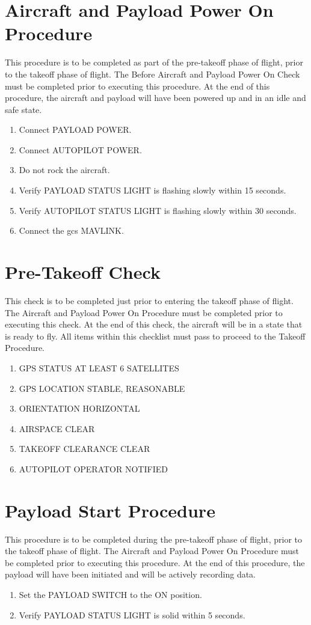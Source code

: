 \documentclass{report}
\begin{document}
	\section{Aircraft and Payload Power On Procedure}
		This procedure is to be completed as part of the pre-takeoff phase of flight, prior to the takeoff phase of flight.  The Before Aircraft and Payload Power On Check must be completed prior to executing this procedure.  At the end of this procedure, the aircraft and payload will have been powered up and in an idle and safe state.
		\begin{enumerate}
			\item Connect PAYLOAD POWER.
			\item Connect AUTOPILOT POWER.
			\item Do not rock the aircraft.
			\item Verify PAYLOAD STATUS LIGHT is flashing slowly within 15 seconds.
			\item Verify AUTOPILOT STATUS LIGHT is flashing slowly within 30 seconds.
			\item Connect the \gls{gcs} MAVLINK.
		\end{enumerate}
	\section{Pre-Takeoff Check}
		This check is to be completed just prior to entering the takeoff phase of flight.  The Aircraft and Payload Power On Procedure must be completed prior to executing this check.  At the end of this check, the aircraft will be in a state that is ready to fly.  All items within this checklist must pass to proceed to the Takeoff Procedure.
		\begin{enumerate}
			\item GPS STATUS \hrulefill AT LEAST 6 SATELLITES
			\item GPS LOCATION \hrulefill STABLE, REASONABLE
			\item ORIENTATION \hrulefill HORIZONTAL
			\item AIRSPACE \hrulefill CLEAR
			\item TAKEOFF CLEARANCE \hrulefill CLEAR
			\item AUTOPILOT OPERATOR \hrulefill NOTIFIED
		\end{enumerate}
	\section{Payload Start Procedure}
		This procedure is to be completed during the pre-takeoff phase of flight, prior to the takeoff phase of flight.  The Aircraft and Payload Power On Procedure must be completed prior to executing this procedure.  At the end of this procedure, the payload will have been initiated and will be actively recording data.
		\begin{enumerate}
			\item Set the PAYLOAD SWITCH to the ON position.
			\item Verify PAYLOAD STATUS LIGHT is solid within 5 seconds.
		\end{enumerate}
\end{document}
